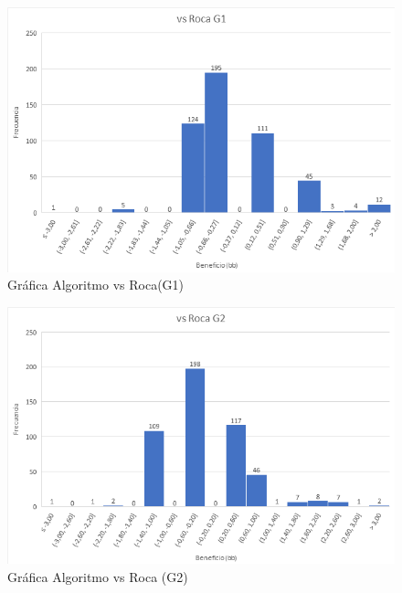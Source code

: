 \begin{figure}[h]
\centering
\includegraphics[width=1\textwidth]{figuras/AvRG1.png}   
\caption{Gráfica Algoritmo vs Roca(G1)}
\label{fig:AvRG1}
\end{figure}

\begin{figure}[h]
\centering
\includegraphics[width=1\textwidth]{figuras/AvRG2.png}   
\caption{Gráfica Algoritmo vs Roca (G2)}
\label{fig:AvRG2}
\end{figure}


